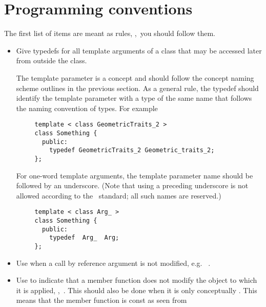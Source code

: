 \section{Programming conventions\label{sec:programming_conventions}}

The first list of items are meant as rules, \ie,~you should follow them.

\begin{itemize}
\item Give typedefs for all template arguments of a class that may be
      accessed later from outside the class.

     The template parameter is a concept and should follow the concept naming
     scheme outlines in the previous section.  As a general rule, the typedef
     should identify the template parameter with a type of the same name that
     follows the naming convention of types.  For example
     \begin{verbatim}
     template < class GeometricTraits_2 >
     class Something {
       public:
         typedef GeometricTraits_2 Geometric_traits_2;
     };
     \end{verbatim}
     For one-word template arguments, the template parameter name should be
     followed by an underscore.  (Note that using a preceding
     underscore is not allowed according to the \CC\ standard; all such names
     are reserved.)%
     \begin{verbatim}
     template < class Arg_ >
     class Something {
       public:
         typedef  Arg_  Arg;
     };
     \end{verbatim}
\item Use  when a call by reference argument is not
      modified, e.g.~%
     .
\item Use  to indicate that a member function does not
      modify the object to which it is applied,
      \eg,~. This should also be
      done when it is only conceptually %
      .
      This means that the member function  is {\ccFont const} as seen from

\end{itemize}
